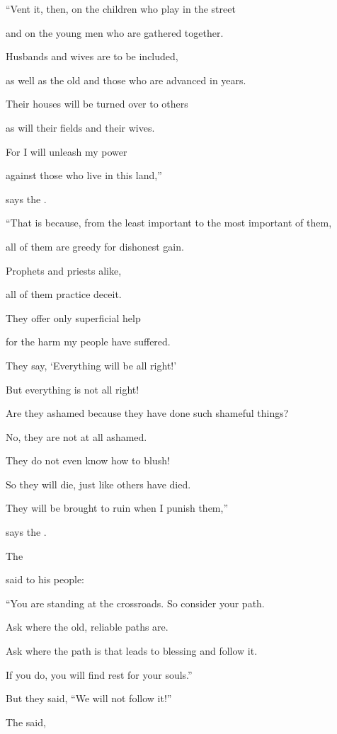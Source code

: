 {\par }{\Q “Vent it,
then, on
the children who play
in the street
\par }{\Q and on
the young men
who are gathered together.
\par }{\Q Husbands
and wives
are to be
included,
\par }{\Q as well as
the old
and those
who are advanced
in years.
\par }{\Q {}Their houses
will be turned
over to others
\par }{\Q as will their fields
and their wives.
\par }{\Q For
I will unleash
my power
\par }{\Q against
those who live
in this land,”
\par }{\PP says
the {}.
\par }{\Q {}“That is because,
from the least
important
to the most important
of them,
\par }{\Q all
of them are greedy
for dishonest gain.
\par }{\Q Prophets
and priests
alike,
\par }{\Q all
of them practice
deceit.
\par }{\Q {}They offer only superficial
help
\par }{\Q for the harm my people
have suffered.
\par }{\Q They say,
‘Everything
will be all right!’
\par }{\Q But everything is not
all right!
\par }{\Q {}Are they ashamed
because
they have done
such shameful things?
\par }{\Q No, they are not
at all ashamed.
\par }{\Q They do not
even
know
how to blush!
\par }{\Q So
they will die,
just like others have died.
\par }{\Q They will be brought
to ruin
when I punish
them,”
\par }{\PP says
the {}.
\par }{\PP {}The

{}
said
to his people:

\par }{\Q “You are standing
at the crossroads. So consider
your path.
\par }{\Q Ask
where the old, reliable
paths
are.
\par }{\Q Ask where
the path
is
that leads to blessing
and follow
it.
\par }{\Q If you do, you will find
rest
for your souls.”
\par }{\Q But they said,
“We will not
follow it!”
\par }{\PP {}The
{} said,

}
